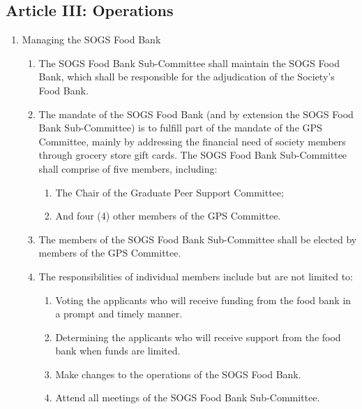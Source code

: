 \subsection{Article III: Operations}
\begin{enumerate}[label*=\arabic*., align=left]	
\item Managing the SOGS Food Bank
\begin{enumerate}[label*=\arabic*., align=left]	
\item The SOGS Food Bank Sub-Committee shall maintain the SOGS Food Bank, which shall be responsible for the adjudication of the Society’s Food Bank.
\item The mandate of the SOGS Food Bank (and by extension the SOGS Food Bank Sub-Committee) is to fulfill part of the mandate of the GPS Committee, mainly by addressing the financial need of society members through grocery store     gift cards.
The SOGS Food Bank Sub-Committee shall comprise of five members, including:
\begin{enumerate}[label*=\arabic*., align=left]
\item The Chair of the Graduate Peer Support Committee;
\item And four (4) other members of the GPS Committee.
\end{enumerate}
\item The members of the SOGS Food Bank Sub-Committee shall be elected by members of the GPS Committee.
\item The responsibilities of individual members include but are not limited to:
\begin{enumerate}[label*=\arabic*., align=left]
\item Voting the applicants who will receive funding from the food bank in a prompt and timely manner.
\item Determining the applicants who will receive support from the food bank when funds are limited.
\item Make changes to the operations of the SOGS Food Bank.
\item Attend all meetings of the SOGS Food Bank Sub-Committee.
\end{enumerate}
\end{enumerate}
\end{enumerate}